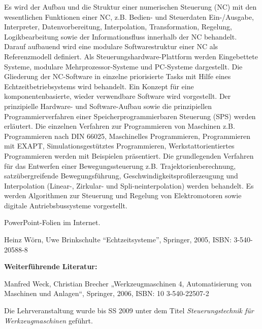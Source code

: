 \begin{course}
\begin{content}
Es wird der Aufbau und die Struktur einer numerischen Steuerung (NC) mit den wesentlichen Funktionen einer NC, z.B. Bedien- und Steuerdaten Ein-/Ausgabe, Interpreter, Datenvorbereitung, Interpolation, Transformation, Regelung, Logikbearbeitung sowie der Informationsfluss innerhalb der NC behandelt. Darauf aufbauend wird eine modulare Softwarestruktur einer NC als Referenzmodell definiert. Als Steuerungshardware-Plattform werden Eingebettete Systeme, modulare Mehrprozessor-Systeme und PC-Systeme dargestellt. Die Gliederung der NC-Software in einzelne priorisierte Tasks mit Hilfe eines Echtzeitbetriebsystems wird behandelt. Ein Konzept für eine komponentenbasierte, wieder verwendbare Software wird vorgestellt. Der prinzipielle Hardware- und Software-Aufbau sowie die prinzipiellen Programmierverfahren einer Speicherprogrammierbaren Steuerung (SPS) werden erläutert. Die einzelnen Verfahren zur Programmieren von Maschinen z.B. Programmieren nach DIN 66025, Maschinelles Programmieren, Programmieren mit EXAPT, Simulationsgestütztes Programmieren, Werkstattorientiertes Programmieren werden mit Beispielen präsentiert. Die grundlegenden Verfahren für das Entwerfen einer Bewegungssteuerung z.B. Trajektorienberechnung, satzübergreifende Bewegungsführung, Geschwindigkeitsprofilerzeugung und Interpolation (Linear-, Zirkular- und Spli-neinterpolation) werden behandelt. Es werden Algorithmen zur Steuerung und Regelung von Elektromotoren sowie digitale Antriebsbussysteme vorgestellt.


\end{content}

\begin{media}PowerPoint-Folien im Internet.

\end{media}

\begin{literature}Heinz Wörn, Uwe Brinkschulte “Echtzeitsysteme”, Springer, 2005, ISBN: 3-540-20588-8

 

\textbf{Weiterführende Literatur:}

 

Manfred Weck, Christian Brecher „Werkzeugmaschinen 4, Automatisierung von Maschinen und Anlagen“, Springer, 2006, ISBN: 10 3-540-22507-2

\end{literature}

\begin{remarks}Die Lehrveranstaltung wurde bis SS 2009 unter dem Titel \emph{Steuerungstechnik für Werkzeugmaschinen} geführt.

\end{remarks}

\end{course}